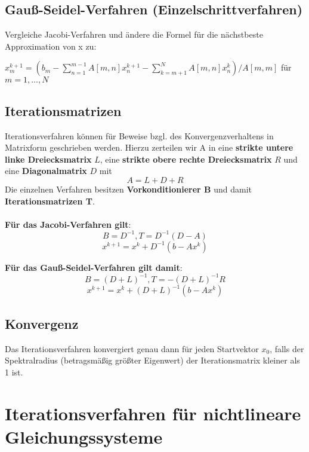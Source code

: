 \documentclass[10pt,a4paper]{article}
\begin{document}
	\subsection{Gauß-Seidel-Verfahren (Einzelschrittverfahren)}
	Vergleiche Jacobi-Verfahren und ändere die Formel für die nächstbeste Approximation von x zu:
	\begin{center}
		$x^{k+1}_m = (b_m - \sum_{n = 1}^{m - 1}A[m, n]x^{k+1}_n - \sum_{k = m + 1}^{N}A[m, n]x_n^k) / A[m, m]$ für $m = 1, ..., N$
	\end{center}
	
	\subsection{Iterationsmatrizen}
	Iterationsverfahren können für Beweise bzgl. des Konvergenzverhaltens in Matrixform geschrieben werden. Hierzu zerteilen wir A in eine \textbf{strikte untere linke Dreiecksmatrix} $L$, eine \textbf{strikte obere rechte Dreiecksmatrix} $R$ und eine \textbf{Diagonalmatrix} $D$ mit $$A = L + D + R$$
	Die einzelnen Verfahren besitzen \textbf{Vorkonditionierer B} und damit \textbf{Iterationsmatrizen T}.\\\\

	\noindent\textbf{Für das Jacobi-Verfahren gilt}:
	$$B = D^{-1}, T = D^{-1}(D - A)$$$$x^{k+1} = x^k + D^{-1}(b - Ax^k)$$

	\noindent\textbf{Für das Gauß-Seidel-Verfahren gilt damit}:
	$$B = (D + L)^{-1}, T = -(D + L)^{-1}R$$$$x^{k+1} = x^k + (D + L)^{-1}(b - Ax^k)$$

	\subsection{Konvergenz}
	Das Iterationsverfahren konvergiert genau dann für jeden Startvektor $x_0$, falls der Spektralradius (betragsmäßig größter Eigenwert) der Iterationsmatrix kleiner als 1 ist.

	\newpage
	\section{Iterationsverfahren für nichtlineare Gleichungssysteme}
\end{document}
